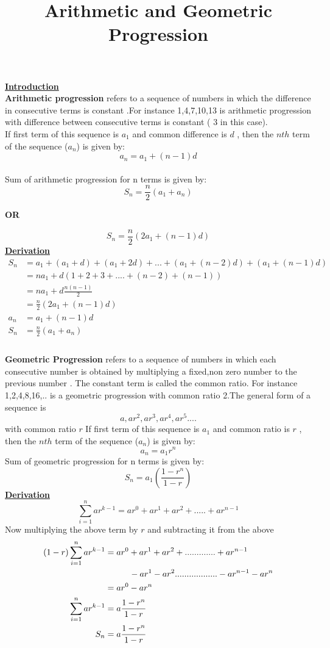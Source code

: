 \documentclass[11pt]{article}
\begin{document}
\title{\textbf{Arithmetic and Geometric Progression}}
\maketitle
{\Large \textbf{\underline{Introduction}}}
\\
\textbf{Arithmetic progression} refers to a sequence of numbers in which the difference in consecutive terms is constant \textbf{\cite{Aparticle}}.For instance 1,4,7,10,13 is arithmetic progression with difference between consecutive terms is constant ( 3 in this case).\\
If first term of this sequence is $a_1$ and common difference is $d$ , then the $nth$ term of the sequence ($a_n$) is given by: 
$$ a_n = a_1 + (n-1)d $$
\\
Sum of arithmetic progression for n terms is given by:
$$S_n = \frac{n}{2}(a_1 + a_n) $$ 
\begin{center}
\textbf{OR}
\end{center}
$$S_n = \frac{n}{2}(2a_1 + (n-1)d) $$
{\Large \textbf{\underline{Derivation}}}
\begin{align*}
S_n &= a_1 + (a_1 + d) + (a_1 + 2d) + ... + (a_1 + (n-2)d) + (a_1 + (n-1)d)\\
 &= na_1 + d(1 + 2 + 3 + .... + (n-2) + (n-1) ) \\
 &= na_1 + d\frac{n(n-1)}{2}\\
 &= \frac{n}{2}(2a_1 + (n-1)d) \\
a_n &= a_1 + (n-1)d\\
S_n &= \frac{n}{2}(a_1 + a_n) \\
\end{align*}
\\
{\Large \textbf{Geometric Progression}} refers to a sequence of numbers in which each consecutive number is obtained by multiplying a fixed,non zero number to the previous number \textbf{\cite{Gparticle}}. The constant term is called the common ratio. For instance 1,2,4,8,16,.. is a geometric progression with common ratio 2.The general form of a sequence is \\
$$ a, ar^2 , ar^3 , ar^4 , ar^5 .... $$
with common ratio $r$ 
If first term of this sequence is $a_1$ and common ratio is $r$ , then the $nth$ term of the sequence ($a_n$) is given by: 
$$ a_n = a_1r^n $$
Sum of geometric progression for n terms is given by:
$$S_n=a_1 (\frac{1-r^n}{1-r})$$
{\Large \textbf{\underline{Derivation}}}
$$ \sum\limits_{i=1}^n ar^{k-1} = ar^0 + ar^1 + ar^2+ ..... + ar^{n-1} $$
Now multiplying the above term by $r$ and subtracting it from the above
 \begin{align*} 
(1-r)\sum\limits_{i=1}^n ar^{k-1} &= ar^0 + ar^1 + ar^2+ ............. + ar^{n-1}\\
 & \hspace{10mm}-ar^1 -ar^2..................-ar^{n-1} - ar^n\\
 &= ar^0 - ar^n\\
\sum\limits_{i=1}^n ar^{k-1} &= a\frac{1 - r^n}{1-r}\\
S_n &= a\frac{1 - r^n}{1-r}
\end{align*}


\end{document}

